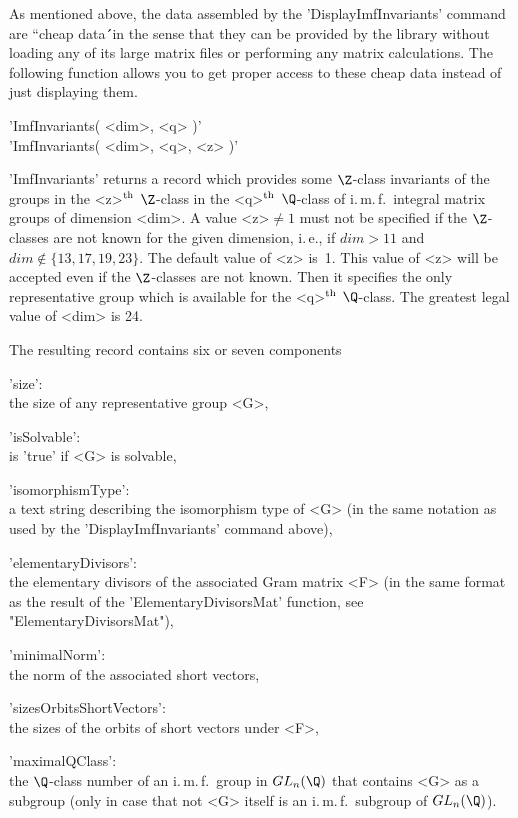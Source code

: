 As  mentioned  above, the data  assembled  by  the 'DisplayImfInvariants'
command are  ``cheap data\'\'\ in the sense  that they can be provided by
the  library without loading any of  its large matrix files or performing
any matrix calculations. The following  function allows you to get proper
access to these cheap data instead of just displaying them.

\vspace{5mm}
'ImfInvariants( <dim>, <q> )'%
 \\
'ImfInvariants( <dim>, <q>, <z> )'

'ImfInvariants' returns     a  record  which  provides   some  $\Z$-class
invariants of   the   groups in  the  <z>$^{\rm  th}$   $\Z$-class in the
<q>$^{\rm    th}$ $\Q$-class of    i.\,m.\,f.~integral  matrix  groups of
dimension  <dim>.  A value  <z>$ \neq  1$ must  not  be  specified if the
$\Z$-classes are not known for the given dimension, i.\,e., if $dim > 11$
and $dim \not \in \{13,17,19,23\}$. The default value of  <z> is~1.  This
value  of <z>   will  be  accepted even   if  the  $\Z$-classes  are  not
known. Then it specifies the only representative group which is available
for the <q>$^{\rm th}$ $\Q$-class.  The greatest legal  value of <dim> is
24.

The resulting record contains six or seven components\:

'size': \\
      the size of any representative group <G>,

'isSolvable': \\
      is 'true' if <G> is solvable,

'isomorphismType': \\
      a text string describing the isomorphism type of  <G>  (in the same
      notation as used by the 'DisplayImfInvariants' command above),

'elementaryDivisors': \\
      the elementary divisors of the associated Gram matrix  <F>  (in the
      same format as the result of the  'ElementaryDivisorsMat' function,
      see "ElementaryDivisorsMat"),

'minimalNorm': \\
      the norm of the associated short vectors,

'sizesOrbitsShortVectors': \\
      the sizes of the orbits of short vectors under <F>,

'maximalQClass': \\
      the  $\Q$-class number  of an  i.\,m.\,f.~group  in $GL_n(\Q)$ that
      contains <G> as a subgroup  (only in case that not <G> itself is an
      i.\,m.\,f.~subgroup of $GL_n(\Q)$).

